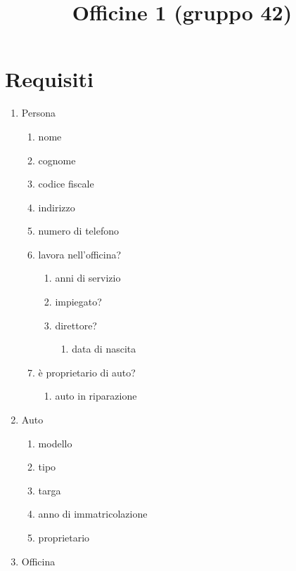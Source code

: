 \documentclass[12pt, letterpaper]{article}
\title{Officine 1 (gruppo 42)}
\date{}
\begin{document}
\maketitle


\section{Requisiti}
\begin{enumerate}
    \item Persona \begin{enumerate}
              \item nome
              \item cognome
              \item codice fiscale
              \item indirizzo
              \item numero di telefono
              \item lavora nell'officina?\begin{enumerate}\item anni di servizio
                        \item impiegato?
                        \item direttore? \begin{enumerate}
                                  \item data di nascita
                              \end{enumerate}
                    \end{enumerate}
              \item è proprietario di auto?\begin{enumerate}
                        \item auto in riparazione
                    \end{enumerate}
          \end{enumerate}
    \item Auto\begin{enumerate}
              \item modello
              \item tipo
              \item targa
              \item anno di immatricolazione
              \item proprietario
          \end{enumerate}
    \item Officina \begin{enumerate}

\end{enumerate}
\end{enumerate}
\end{document}
